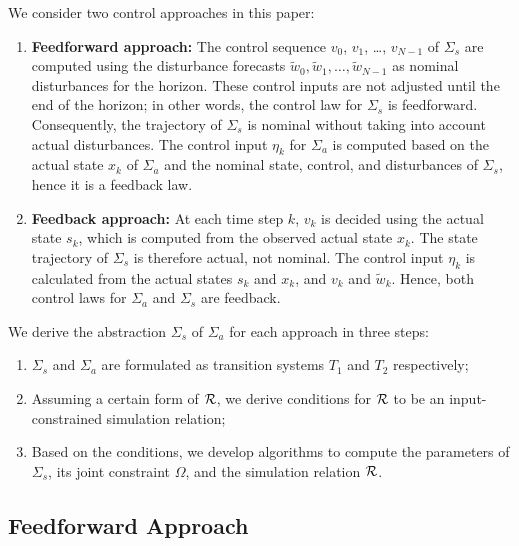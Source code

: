 We consider two control approaches in this paper:
\begin{enumerate}
\item \textbf{Feedforward approach:} The control sequence $v_{0}$, $v_{1}$, \dots, $v_{N-1}$ of $\Sigma_{s}$ are computed using the disturbance forecasts $\tilde{w}_{0}, \tilde{w}_{1}, \dots, \tilde{w}_{N-1}$ as nominal disturbances for the horizon.  These control inputs are not adjusted until the end of the horizon; in other words, the control law for $\Sigma_{s}$ is feedforward.  Consequently, the trajectory of $\Sigma_{s}$ is nominal without taking into account actual disturbances.  The control input $\eta_{k}$ for $\Sigma_{a}$ is computed based on the actual state $x_{k}$ of $\Sigma_{a}$ and the nominal state, control, and disturbances of $\Sigma_{s}$, hence it is a feedback law.
\item \textbf{Feedback approach:} At each time step $k$, $v_{k}$ is decided using the actual state $s_{k}$, which is computed from the observed actual state $x_{k}$. %
  The state trajectory of $\Sigma_{s}$ is therefore actual, not nominal.  The control input $\eta_{k}$ is calculated from the actual states $s_{k}$ and $x_{k}$, and $v_{k}$ and $\tilde{w}_{k}$.  Hence, both control laws for $\Sigma_{a}$ and $\Sigma_{s}$ are feedback.
\end{enumerate}

We derive the abstraction $\Sigma_{s}$ of $\Sigma_{a}$ for each approach in three steps:
\begin{enumerate}
\item $\Sigma_{s}$ and $\Sigma_{a}$ are formulated as transition systems $T_{1}$ and $T_{2}$ respectively;
\item Assuming a certain form of $\mathcal{R}$, we derive %
  conditions for $\mathcal{R}$ to be an input-constrained simulation relation;
\item Based on the conditions, we develop algorithms to compute the parameters of $\Sigma_{s}$, its joint constraint $\Omega$, and the simulation relation $\mathcal{R}$.
\end{enumerate}
%


\subsection{Feedforward Approach}
\label{sec:abstraction-gs:feedforward}

